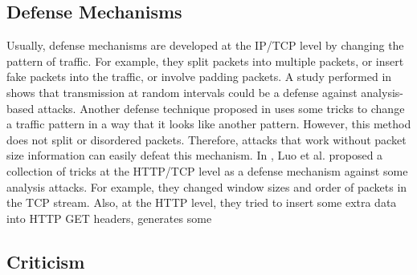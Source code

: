 \subsection{Defense Mechanisms}
Usually, defense mechanisms are developed at the IP/TCP level by changing the pattern of traffic. For example, they split packets into multiple packets, or insert fake packets into the traffic, or involve padding packets. A study performed in \cite{fu2003} shows that transmission at random intervals could be a defense against analysis-based attacks. Another defense technique proposed in \cite{wright2009} uses some tricks to change a traffic pattern in a way that it looks like another pattern. However, this method does not split or disordered packets. Therefore, attacks that work without packet size information can easily defeat this mechanism. In \cite{luo2011}, Luo et al. proposed a collection of tricks at the HTTP/TCP level as a defense mechanism against some analysis attacks. For example, they changed window sizes and order of packets in the TCP stream. Also, at the HTTP level, they tried to insert some
extra data into HTTP GET headers, generates some   

\subsection{Criticism}

